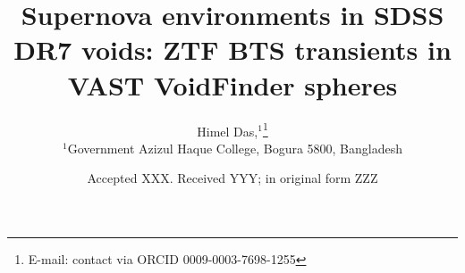 \documentclass[fleqn,usenatbib]{mnras}
\title[VOIDS: supernovae in SDSS DR7 voids]{Supernova environments in SDSS DR7 voids: ZTF BTS transients in VAST VoidFinder spheres}
\author[H. Das]{
Himel Das,$^{1}$\thanks{E-mail: contact via ORCID 0009-0003-7698-1255}
\\
$^{1}$Government Azizul Haque College, Bogura 5800, Bangladesh\\
}
\date{Accepted XXX. Received YYY; in original form ZZZ}
\begin{document}
\label{firstpage}
\pagerange{\pageref{firstpage}--\pageref{lastpage}}
\maketitle
\label{lastpage}
\begin{abstract}

\end{abstract}
\begin{keywords}

\end{keywords}









\end{document}
